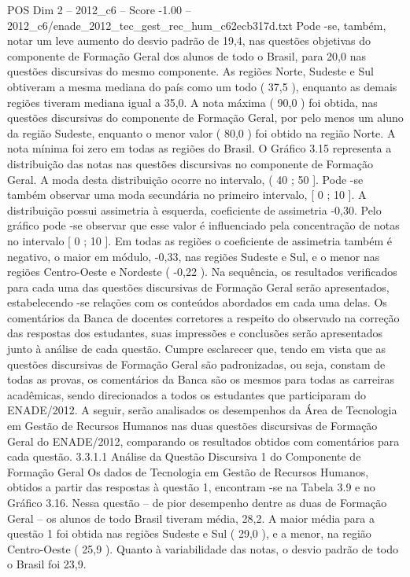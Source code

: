 \begin{textsample}{POS Dim 2 – 2012\_c6 – Score -1.00 – 2012\_c6/enade\_2012\_tec\_gest\_rec\_hum\_c62ecb317d.txt}
Pode -se, também, notar um leve aumento do desvio padrão de 19,4, nas questões objetivas do componente de Formação Geral dos alunos de todo o Brasil, para 20,0 nas questões discursivas do mesmo componente.
As regiões Norte, Sudeste e Sul obtiveram a mesma mediana do país como um todo ( 37,5 ), enquanto as demais regiões tiveram mediana igual a 35,0.
A nota máxima ( 90,0 ) foi obtida, nas questões discursivas do componente de Formação Geral, por pelo menos um aluno da região Sudeste, enquanto o menor valor ( 80,0 ) foi obtido na região Norte.
A nota mínima foi zero em todas as regiões do Brasil.
O Gráfico 3.15 representa a distribuição das notas nas questões discursivas no componente de Formação Geral.
A moda desta distribuição ocorre no intervalo, ( 40 ; 50 ].
Pode -se também observar uma moda secundária no primeiro intervalo, [ 0 ; 10 ].
A distribuição possui assimetria à esquerda, coeficiente de assimetria -0,30.
Pelo gráfico pode -se observar que esse valor é influenciado pela concentração de notas no intervalo [ 0 ; 10 ].
Em todas as regiões o coeficiente de assimetria também é negativo, o maior em módulo, -0,33, nas regiões Sudeste e Sul, e o menor nas regiões Centro-Oeste e Nordeste ( -0,22 ).
Na sequência, os resultados verificados para cada uma das questões discursivas de Formação Geral serão apresentados, estabelecendo -se relações com os conteúdos abordados em cada uma delas.
Os comentários da Banca de docentes corretores a respeito do observado na correção das respostas dos estudantes, suas impressões e conclusões serão apresentados junto à análise de cada questão.
Cumpre esclarecer que, tendo em vista que as questões discursivas de Formação Geral são padronizadas, ou seja, constam de todas as provas, os comentários da Banca são os mesmos para todas as carreiras acadêmicas, sendo direcionados a todos os estudantes que participaram do ENADE/2012.
A seguir, serão analisados os desempenhos da Área de Tecnologia em Gestão de Recursos Humanos nas duas questões discursivas de Formação Geral do ENADE/2012, comparando os resultados obtidos com comentários para cada questão. 3.3.1.1 Análise da Questão Discursiva 1 do Componente de Formação Geral Os dados de Tecnologia em Gestão de Recursos Humanos, obtidos a partir das respostas à questão 1, encontram -se na Tabela 3.9 e no Gráfico 3.16.
Nessa questão – de pior desempenho dentre as duas de Formação Geral – os alunos de todo Brasil tiveram média, 28,2.
A maior média para a questão 1 foi obtida nas regiões Sudeste e Sul ( 29,0 ), e a menor, na região Centro-Oeste ( 25,9 ).
Quanto à variabilidade das notas, o desvio padrão de todo o Brasil foi 23,9.

\end{textsample}
